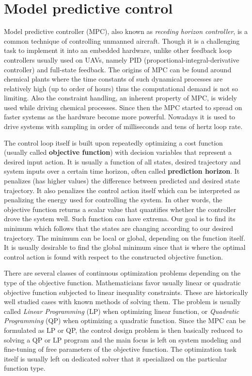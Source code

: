 \section{Model predictive control}

Model predictive controller (MPC), also known as \textit{receding horizon controller}, is a common technique of controlling unmanned aircraft. Though it is a challenging task to implement it into an embedded hardware, unlike other feedback loop controllers usually used on UAVs, namely PID (proportional-integral-derivative controller) and full-state feedback. The origins of MPC can be found around chemical plants where the time constants of such dynamical processes are relatively high (up to order of hours) thus the computational demand is not so limiting. Also the constraint handling, an inherent property of MPC, is widely used while driving chemical processes. Since then the MPC started to spread on faster systems as the hardware become more powerful. Nowadays it is used to drive systems with sampling in order of milliseconds and tens of hertz loop rate.

The control loop itself is built upon repeatedly optimizing a cost function (usually called \textbf{objective function}) with decision variables that represent a desired input action. It is usually a function of all states, desired trajectory and system inputs over a certain time horizon, often called \textbf{prediction horizon}. It penalizes (has higher values) the difference between predicted and desired state trajectory. It also penalizes the control action itself which can be interpreted as penalizing the energy used for controlling the system. In other words, the objective function returns a scalar value that quantifies whether the controller drove the system well. Such function can have extrema. Our goal is to find its minimum which follows that the states are changing according to our desired trajectory. The minimum can be local or global, depending on the function itself. It is usually desirable to find the global minimum since that is where the optimal control action is found with respect to the constructed objective function.

There are several classes of continuous optimization problems depending on the type of the objective function. Mathematicians favor usually linear or quadratic objective function subjected to linear inequality constraints. These are historically well studied cases with known methods of solving them. The problem is usually called \textit{Linear Programming} (LP) when optimizing linear function, or \textit{Quadratic Programming} (QP) when optimizing a quadratic function. Since the MPC can be formulated as LP or QP, the control design problem is then basically reduced to solving a QP or LP program and the main focus is left on system modeling and fine-tuning of free parameters of the objective function. The optimization task itself is usually left on dedicated solver that it specialized on the particular function type. 


